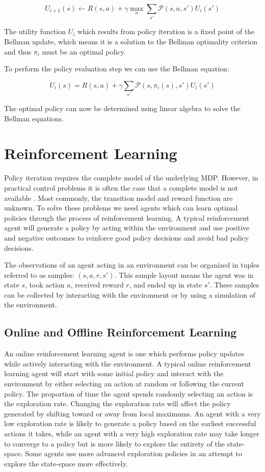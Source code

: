 \[
    U_{i+1}(s) \gets R(s,a) + \gamma \max_a \sum_{s'}\mathcal{P}(s,a,s')U_i(s')
\]

The utility function $U_i$ which results from policy iteration is a fixed point of the Bellman update, which means it is a solution to the Bellman optimality criterion and thus $\pi_i$ must be an optimal policy.

To perform the policy evaluation step we can use the Bellman equation:

\[
    U_i(s) = R(s,a) + \gamma \sum_{s'} \mathcal{P}(s, \pi_i(s), s')U_i(s')
\]

The optimal policy can now be determined using linear algebra to solve the Bellman equations.

\section{Reinforcement Learning}

Policy iteration requires the complete model of the underlying MDP. However, in practical control problems it is often the case that a complete model is not available \cite{lspi}. Most commonly, the transition model and reward function are unknown. To solve these problems we need agents which can learn optimal policies through the process of reinforcement learning. A typical reinforcement agent will generate a policy by acting within the environment and use positive and negative outcomes to reinforce good policy decisions and avoid bad policy decisions.

The observations of an agent acting in an environment can be organized in tuples referred to as samples: $(s, a, r, s')$. This sample layout means the agent was in state $s$, took action $a$, received reward $r$, and ended up in state $s'$. These samples can be collected by interacting with the environment or by using a simulation of the environment.

\subsection{Online and Offline Reinforcement Learning}

An online reinforcement learning agent is one which performs policy updates while actively interacting with the environment. A typical online reinforcement learning agent will start with some initial policy and interact with the environment by either selecting an action at random or following the current policy. The proportion of time the agent spends randomly selecting an action is the exploration rate. Changing the exploration rate will affect the policy generated by shifting toward or away from local maximums. An agent with a very low exploration rate is likely to generate a policy based on the earliest successful actions it takes, while an agent with a very high exploration rate may take longer to converge to a policy but is more likely to explore the entirety of the state-space. Some agents use more advanced exploration policies in an attempt to explore the state-space more effectively.

